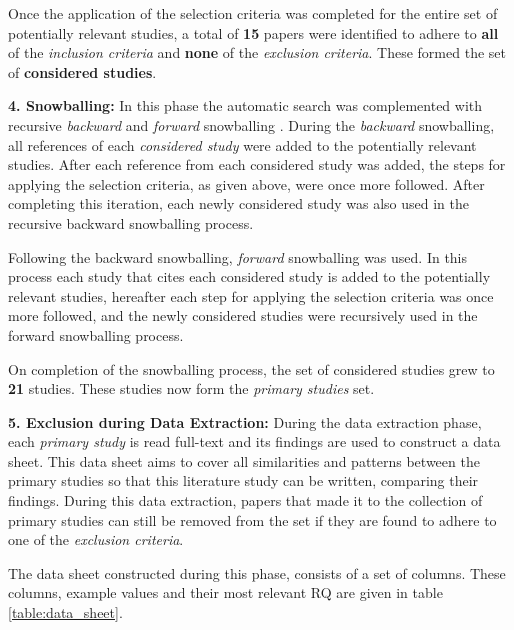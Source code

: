 Once the application of the selection criteria was completed for the entire set of potentially relevant studies,
a total of \textbf{15} papers were identified to adhere to \textbf{all} of the \textit{inclusion criteria} and
\textbf{none} of the \textit{exclusion criteria}. These formed the set of \textbf{considered studies}.

\vspace{5mm}

\noindent\textbf{4. Snowballing:}
In this phase the automatic search was complemented with recursive \textit{backward} and \textit{forward} snowballing \cite{wohlin2014snowballing}.
During the \textit{backward} snowballing, all references of each \textit{considered study} were added to the potentially relevant studies. 
After each reference from each considered study was added, the steps for applying the selection criteria, as given above, were once more followed. 
After completing this iteration, each newly considered study was also used in the recursive backward snowballing process.

Following the backward snowballing, \textit{forward} snowballing was used. 
In this process each study that cites each considered study is added to the potentially relevant studies, hereafter each step for applying the selection criteria was once more followed, and the newly considered studies were recursively used in the forward snowballing process.

\vspace{5mm}

On completion of the snowballing process, the set of considered studies grew to \textbf{21} studies. These studies now form the \textit{primary studies} set.

\vspace{5mm}

\noindent\textbf{5. Exclusion during Data Extraction:}
During the data extraction phase, each \textit{primary study} is read full-text and its findings are used to construct a data sheet.
This data sheet aims to cover all similarities and patterns between the primary studies so that this literature study can be written, comparing their findings.
During this data extraction, papers that made it to the collection of primary studies can still be removed from the set if they are found to adhere to one of the \textit{exclusion criteria}.

The data sheet constructed during this phase, consists of a set of columns. 
These columns, example values and their most relevant RQ are given in table \ref{table:data_sheet}.

